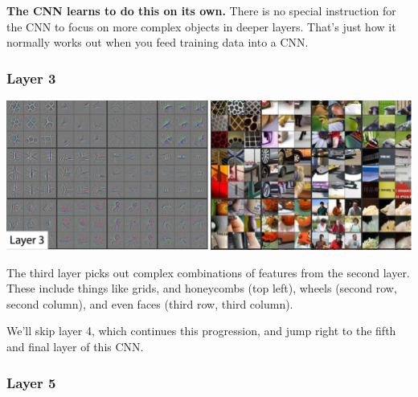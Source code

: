 \textbf{The CNN learns to do this on its own.} There is no special instruction for the CNN to focus on more complex objects in deeper layers. That's just how it normally works out when you feed training data into a CNN.

\subsubsection{Layer 3}

\includegraphics[width=1\linewidth]{img//cnn//transfer/screen-shot-2016-11-24-at-12.09.24-pm.png}

The third layer picks out complex combinations of features from the second layer. These include things like grids, and honeycombs (top left), wheels (second row, second column), and even faces (third row, third column).

We'll skip layer 4, which continues this progression, and jump right to the fifth and final layer of this CNN.

\subsubsection{Layer 5}

